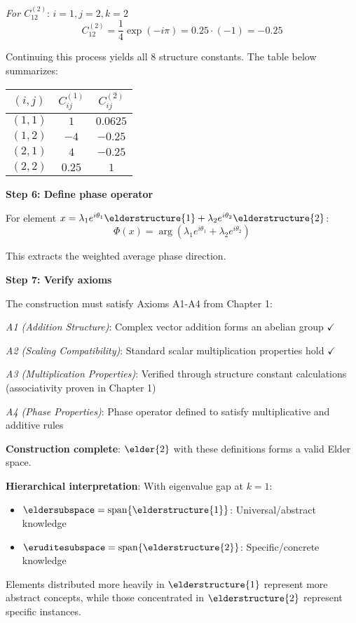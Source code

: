 \begin{example}
\textit{For $C_{12}^{(2)}$}: $i=1, j=2, k=2$
$$C_{12}^{(2)} = \frac{1}{4} \exp(-i\pi) = 0.25 \cdot (-1) = -0.25$$

Continuing this process yields all 8 structure constants. The table below summarizes:

\begin{center}
\begin{tabular}{|c|c|c|}
\hline
$(i,j)$ & $C_{ij}^{(1)}$ & $C_{ij}^{(2)}$ \\
\hline
$(1,1)$ & $1$ & $0.0625$ \\
$(1,2)$ & $-4$ & $-0.25$ \\
$(2,1)$ & $4$ & $-0.25$ \\
$(2,2)$ & $0.25$ & $1$ \\
\hline
\end{tabular}
\end{center}

\textbf{Step 6: Define phase operator}

For element $x = \lambda_1 e^{i\theta_1} \elderstructure{1} + \lambda_2 e^{i\theta_2} \elderstructure{2}$:
$$\Phi(x) = \arg\left(\lambda_1 e^{i\theta_1} + \lambda_2 e^{i\theta_2}\right)$$

This extracts the weighted average phase direction.

\textbf{Step 7: Verify axioms}

The construction must satisfy Axioms A1-A4 from Chapter 1:

\textit{A1 (Addition Structure)}: Complex vector addition forms an abelian group $\checkmark$

\textit{A2 (Scaling Compatibility)}: Standard scalar multiplication properties hold $\checkmark$

\textit{A3 (Multiplication Properties)}: Verified through structure constant calculations (associativity proven in Chapter 1)

\textit{A4 (Phase Properties)}: Phase operator defined to satisfy multiplicative and additive rules

\textbf{Construction complete}: $\elder{2}$ with these definitions forms a valid Elder space.

\textbf{Hierarchical interpretation}: With eigenvalue gap at $k=1$:
\begin{itemize}
\item $\eldersubspace = \mathrm{span}\{\elderstructure{1}\}$: Universal/abstract knowledge
\item $\eruditesubspace = \mathrm{span}\{\elderstructure{2}\}$: Specific/concrete knowledge
\end{itemize}

Elements distributed more heavily in $\elderstructure{1}$ represent more abstract concepts, while those concentrated in $\elderstructure{2}$ represent specific instances.
\end{example}

